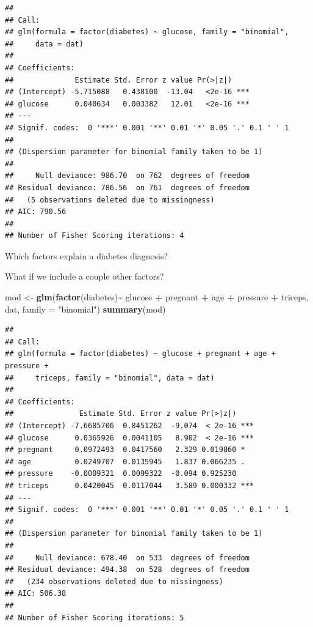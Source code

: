 \documentclass[
]{book}
\newenvironment{Shaded}{\begin{snugshade}}{\end{snugshade}}
\newcommand{\AttributeTok}[1]{\textcolor[rgb]{0.13,0.29,0.53}{#1}}
\newcommand{\FunctionTok}[1]{\textcolor[rgb]{0.13,0.29,0.53}{\textbf{#1}}}
\newcommand{\NormalTok}[1]{#1}
\newcommand{\OtherTok}[1]{\textcolor[rgb]{0.56,0.35,0.01}{#1}}
\newcommand{\SpecialCharTok}[1]{\textcolor[rgb]{0.81,0.36,0.00}{\textbf{#1}}}
\newcommand{\StringTok}[1]{\textcolor[rgb]{0.31,0.60,0.02}{#1}}
\begin{document}
\begin{verbatim}
## 
## Call:
## glm(formula = factor(diabetes) ~ glucose, family = "binomial", 
##     data = dat)
## 
## Coefficients:
##              Estimate Std. Error z value Pr(>|z|)    
## (Intercept) -5.715088   0.438100  -13.04   <2e-16 ***
## glucose      0.040634   0.003382   12.01   <2e-16 ***
## ---
## Signif. codes:  0 '***' 0.001 '**' 0.01 '*' 0.05 '.' 0.1 ' ' 1
## 
## (Dispersion parameter for binomial family taken to be 1)
## 
##     Null deviance: 986.70  on 762  degrees of freedom
## Residual deviance: 786.56  on 761  degrees of freedom
##   (5 observations deleted due to missingness)
## AIC: 790.56
## 
## Number of Fisher Scoring iterations: 4
\end{verbatim}

Which factors explain a diabetes diagnosis?

What if we include a couple other factors?

\begin{Shaded}
\begin{Highlighting}[]
\NormalTok{mod }\OtherTok{\textless{}{-}} \FunctionTok{glm}\NormalTok{(}\FunctionTok{factor}\NormalTok{(diabetes)}\SpecialCharTok{\textasciitilde{}}\NormalTok{ glucose }\SpecialCharTok{+}\NormalTok{ pregnant }\SpecialCharTok{+}\NormalTok{ age }\SpecialCharTok{+}\NormalTok{ pressure }\SpecialCharTok{+}\NormalTok{ triceps,}
\NormalTok{    dat,}
    \AttributeTok{family =} \StringTok{"binomial"}\NormalTok{)}
\FunctionTok{summary}\NormalTok{(mod)}
\end{Highlighting}
\end{Shaded}

\begin{verbatim}
## 
## Call:
## glm(formula = factor(diabetes) ~ glucose + pregnant + age + pressure + 
##     triceps, family = "binomial", data = dat)
## 
## Coefficients:
##               Estimate Std. Error z value Pr(>|z|)    
## (Intercept) -7.6685706  0.8451262  -9.074  < 2e-16 ***
## glucose      0.0365926  0.0041105   8.902  < 2e-16 ***
## pregnant     0.0972493  0.0417560   2.329 0.019860 *  
## age          0.0249707  0.0135945   1.837 0.066235 .  
## pressure    -0.0009321  0.0099322  -0.094 0.925230    
## triceps      0.0420045  0.0117044   3.589 0.000332 ***
## ---
## Signif. codes:  0 '***' 0.001 '**' 0.01 '*' 0.05 '.' 0.1 ' ' 1
## 
## (Dispersion parameter for binomial family taken to be 1)
## 
##     Null deviance: 678.40  on 533  degrees of freedom
## Residual deviance: 494.38  on 528  degrees of freedom
##   (234 observations deleted due to missingness)
## AIC: 506.38
## 
## Number of Fisher Scoring iterations: 5
\end{verbatim}
\end{document}
